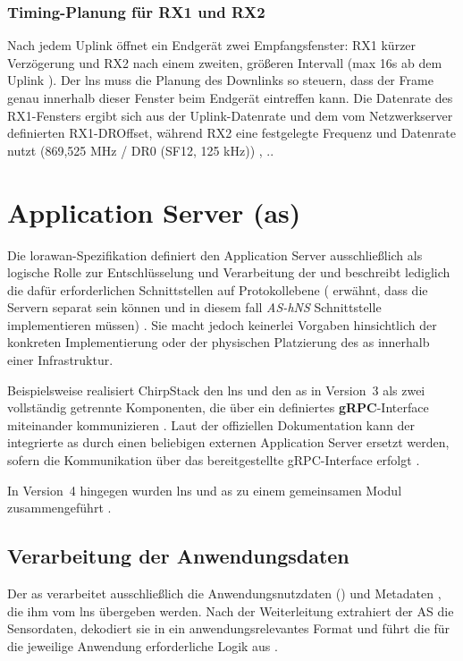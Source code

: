 \subsubsection{Timing-Planung für RX1 und RX2}
	Nach jedem Uplink öffnet ein Endgerät zwei Empfangsfenster: RX1 kürzer Verzögerung und RX2 nach einem zweiten, grö{\ss}eren Intervall (max 16s ab dem Uplink \cite{LoRaAlliance:2020b}). Der \ac{lns} muss die Planung des Downlinks so steuern, dass der Frame genau innerhalb dieser Fenster beim Endgerät eintreffen kann. Die Datenrate des RX1-Fensters ergibt sich aus der Uplink-Datenrate und dem vom Netzwerkserver definierten RX1-DROffset, während RX2 eine festgelegte Frequenz und Datenrate nutzt (869{,}525 MHz / DR0 (SF12, 125 kHz)) \cite{Semtech:2024}, \cite[13]{LoRaAlliance:2020b}..

\section{Application Server (\acs{as}) \label{server:appserver}}
	Die \ac{lorawan}-Spezifikation definiert den Application Server ausschlie{\ss}lich als logische Rolle zur Entschlüsselung und Verarbeitung der  und beschreibt lediglich die dafür erforderlichen Schnittstellen auf Protokollebene (\textcite{LoRaAlliance:2020c} erwähnt, dass die Servern separat sein können und in diesem fall \textit{AS-hNS} Schnittstelle implementieren müssen) \cite{LoRaAlliance:2020c}. Sie macht jedoch keinerlei Vorgaben hinsichtlich der konkreten Implementierung oder der physischen Platzierung des \ac{as} innerhalb einer Infrastruktur. 

	Beispielsweise realisiert ChirpStack den \ac{lns} und den \ac{as} in Version~3 als zwei vollständig getrennte Komponenten, die über ein definiertes \textbf{gRPC}-Interface miteinander kommunizieren \cite{ChirpStack:2020}. Laut der offiziellen Dokumentation kann der integrierte \ac{as} durch einen beliebigen externen Application Server ersetzt werden, sofern die Kommunikation über das bereitgestellte gRPC-Interface erfolgt \cite{ChirpStack:2022}. 
	
	In Version~4 hingegen wurden \ac{lns} und \ac{as} zu einem gemeinsamen Modul zusammengeführt \cite{ChirpStack:2022d, Garcia:2025b}.
	
	
\subsection{Verarbeitung der Anwendungsdaten}
	Der \ac{as} verarbeitet ausschlie{\ss}lich die Anwendungsnutzdaten () und Metadaten , die ihm vom \ac{lns} übergeben werden. Nach der Weiterleitung extrahiert der \ac{AS} die Sensordaten, dekodiert sie in ein anwendungsrelevantes Format und führt die für die jeweilige Anwendung erforderliche Logik aus \cite{LoRaAlliance:2020c}.

